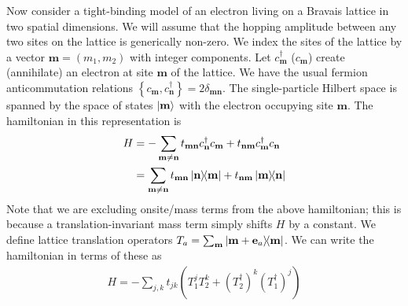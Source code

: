\documentclass[aps,prb,twocolumn,letterpaper,twoside,nobalancelastpage,groupedaddress,amsmath,amssymb,floatfix,citeautoscript]{revtex4-1}
\begin{document}
Now consider a tight-binding model of an electron living on a Bravais lattice in two spatial dimensions. 
We will assume that the hopping amplitude between any two sites on the lattice is generically non-zero. We index the sites of the lattice by a vector $\mathbf{m} = (m_1, m_2)$ with integer components. Let $c^{\dag}_{\mathbf{m}}$ ($c_{\mathbf{m}}$) create (annihilate) an electron at site $\mathbf{m}$ of the lattice. We have the usual fermion anticommutation relations $\left\{c_{\mathbf{m}},c_{\mathbf{n}}^{\dag}\right\} = 2\delta_{\mathbf{m} \mathbf{n}}$. The single-particle Hilbert space is spanned by the space of states $\ket{\mathbf{m}}$ with the electron occupying site $\mathbf{m}$. The hamiltonian in this representation is
\begin{align*}
H &= -\sum_{\mathbf{m}\neq \mathbf{n}} t_{\mathbf{m}\mathbf{n}} c^{\dag}_\mathbf{n} c_\mathbf{m}  + t_{\mathbf{n}\mathbf{m}} c^{\dag}_{\mathbf{m}} c_{\mathbf{n}}\\  &= \sum_{\mathbf{m}\neq \mathbf{n}} t_{\mathbf{m}\mathbf{n}} \dyad{\mathbf{n}}{\mathbf{m}} + t_{\mathbf{n}\mathbf{m}} \dyad{\mathbf{m}}{\mathbf{n}}
\end{align*}
Note that we are excluding onsite/mass terms from the above hamiltonian; this is because a translation-invariant mass term simply shifts $H$ by a constant. We define lattice translation operators $T_a = \sum_{\bfm} \dyad{\mathbf{m} + \mathbf{e}_a}{\mathbf{m}}$. We can write the hamiltonian in terms of these as
\begin{align}
\label{eq-b0-lattice-hamiltonian}
H = -\sum_{j,k} t_{jk} \left(T_1^j T_2^k + (T^{\dag}_2)^{k} (T^{\dag}_1)^{j}\right)
\end{align}
\end{document}
